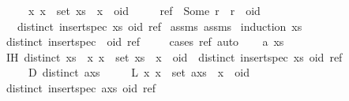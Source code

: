 \begin{isabellebody}
\ \ \ \ \ {\isachardoublequoteopen}{\isasymAnd}x{\isachardot}\ x\ {\isasymin}\ set\ xs\ {\isasymLongrightarrow}\ x\ {\isacharless}\ oid{\isachardoublequoteclose}\isanewline
\ \ \ \ \ {\isachardoublequoteopen}ref\ {\isacharequal}\ Some\ r\ {\isasymlongrightarrow}\ r\ {\isacharless}\ oid{\isachardoublequoteclose}\isanewline
\ \ \ {\isachardoublequoteopen}distinct\ {\isacharparenleft}insert{\isacharunderscore}spec\ xs\ {\isacharparenleft}oid{\isacharcomma}\ ref{\isacharparenright}{\isacharparenright}{\isachardoublequoteclose}\isanewline
%
\isadelimproof
%
\endisadelimproof
%
\isatagproof
{}\isamarkupfalse%
\ assms{\isacharparenleft}{}{\isacharparenright}\ assms{\isacharparenleft}{}{\isacharparenright}\ \isamarkupfalse%
{\isacharparenleft}induction\ xs{\isacharparenright}\isanewline
\ \ \isamarkupfalse%
\ {\isachardoublequoteopen}distinct\ {\isacharparenleft}insert{\isacharunderscore}spec\ {\isacharbrackleft}{\isacharbrackright}\ {\isacharparenleft}oid{\isacharcomma}\ ref{\isacharparenright}{\isacharparenright}{\isachardoublequoteclose}\isanewline
\ \ \ \ \isamarkupfalse%
{\isacharparenleft}cases\ ref{\isacharcomma}\ auto{\isacharparenright}\isanewline
{}\isamarkupfalse%
\isanewline
\ \ \isamarkupfalse%
\ a\ xs\isanewline
\ \ \isamarkupfalse%
\ IH{\isacharcolon}\ {\isachardoublequoteopen}distinct\ xs\ {\isasymLongrightarrow}\ {\isacharparenleft}{\isasymAnd}x{\isachardot}\ x\ {\isasymin}\ set\ xs\ {\isasymLongrightarrow}\ x\ {\isacharless}\ oid{\isacharparenright}\ {\isasymLongrightarrow}\ distinct\ {\isacharparenleft}insert{\isacharunderscore}spec\ xs\ {\isacharparenleft}oid{\isacharcomma}\ ref{\isacharparenright}{\isacharparenright}{\isachardoublequoteclose}\isanewline
\ \ \ \ \ D{\isacharcolon}\ {\isachardoublequoteopen}distinct\ {\isacharparenleft}a{\isacharhash}xs{\isacharparenright}{\isachardoublequoteclose}\isanewline
\ \ \ \ \ L{\isacharcolon}\ {\isachardoublequoteopen}{\isasymAnd}x{\isachardot}\ x\ {\isasymin}\ set\ {\isacharparenleft}a{\isacharhash}xs{\isacharparenright}\ {\isasymLongrightarrow}\ x\ {\isacharless}\ oid{\isachardoublequoteclose}\isanewline
\ \ \isamarkupfalse%
\ {\isachardoublequoteopen}distinct\ {\isacharparenleft}insert{\isacharunderscore}spec\ {\isacharparenleft}a{\isacharhash}xs{\isacharparenright}\ {\isacharparenleft}oid{\isacharcomma}\ ref{\isacharparenright}{\isacharparenright}{\isachardoublequoteclose}\isanewline

\end{isabellebody}
